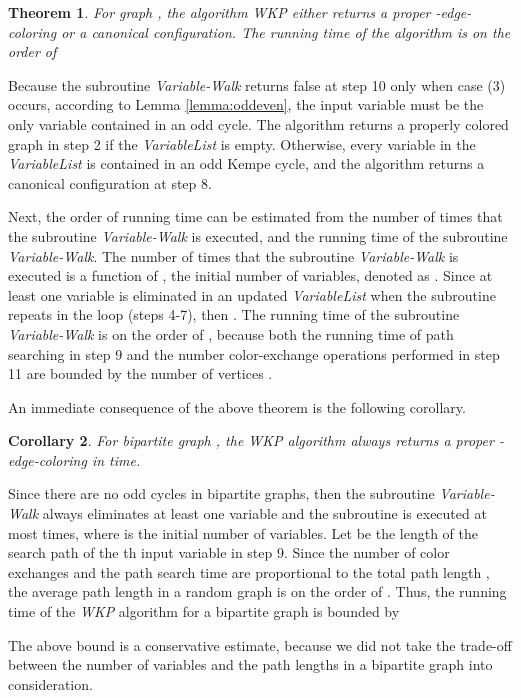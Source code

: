 \documentclass[11pt]{article}
\newtheorem{theorem}{Theorem}[section]
\newtheorem{corollary}[theorem]{Corollary}
\newenvironment{proof}[1][Proof]{\begin{trivlist}
\item[\hskip \labelsep {\bfseries #1}]}{\end{trivlist}}
\newcommand{\qed}{\nobreak \ifvmode \relax \else
      \ifdim\lastskip<1.5em \hskip-\lastskip
      \hskip1.5em plus0em minus0.5em \fi \nobreak
      \vrule height0.75em width0.5em depth0.25em\fi}
\begin{document}
\begin{theorem}
\label{theorem:canonical}
For graph , the algorithm WKP either returns a proper -edge-coloring or a canonical configuration. The running time of the algorithm is on the order of 
\end{theorem}

\begin{proof}
Because the subroutine {\it Variable-Walk} returns false at step 10 only when case (3) occurs, according to Lemma \ref{lemma:oddeven}, the input variable  must be the only variable contained in an odd  cycle. The algorithm returns a properly colored graph in step 2 if the {\it VariableList} is empty. Otherwise, every variable in the {\it VariableList} is contained in an odd Kempe cycle, and the algorithm returns a canonical configuration at step 8.

Next, the order of running time  can be estimated from the number of times that the subroutine {\it Variable-Walk} is executed, and the running time of the subroutine {\it Variable-Walk}. The number of times that the subroutine {\it Variable-Walk} is executed is a function of , the initial number of variables, denoted as . Since at least one variable is eliminated in an updated {\it VariableList} when the subroutine repeats in the loop (steps 4-7), then . The running time of the subroutine {\it Variable-Walk} is on the order of , because both the running time of path searching in step 9 and the number color-exchange operations performed in step 11 are bounded by the number of vertices . \qed
\end{proof}

An immediate consequence of the above theorem is the following corollary.
\begin{corollary}
For bipartite graph , the WKP algorithm always returns a proper -edge-coloring in  time.
\end{corollary}

\begin{proof}
Since there are no odd cycles in bipartite graphs, then the subroutine {\it Variable-Walk} always eliminates at least one variable and the subroutine is executed at most  times, where  is the initial number of variables. Let   be the length of the search path of the th input variable in step 9. Since the number of color exchanges and the path search time are proportional to the total path length  , the average path length in a random graph is on the order of  \cite{fronczak2004average}. Thus, the running time of the {\it WKP} algorithm for a bipartite graph   is bounded by 
 
\end{proof}
The above bound is a conservative estimate, because we did not take the trade-off between the number of variables  and the path lengths in a bipartite graph into consideration. 
\end{document}
